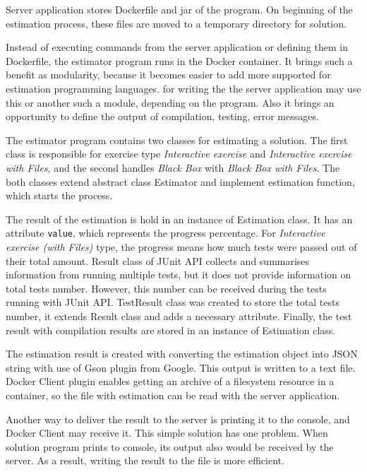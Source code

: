         Server application stores Dockerfile and jar of the program. On beginning of the estimation process, these files are moved to a temporary directory for solution. 
        
        Instead of executing commands from the server application or defining them in Dockerfile, the estimator program runs in the Docker container. It brings such a benefit as modularity, because it becomes easier to add more supported for estimation programming languages. 
        for writing the  the server application may use this or another such a module, depending on the program. Also it brings an opportunity to define the output of compilation, testing, error messages.
        
        The estimator program contains two classes for estimating a solution. The first class is responsible for exercise type \textit{Interactive exercise} and \textit{Interactive exercise with Files}, and the second handles \textit{Black Box} with \textit{Black Box with Files}. The both classes extend abstract class Estimator and implement estimation function, which starts the process.
        
        The result of the estimation is hold in an instance of Estimation class. It has an attribute \texttt{value}, which represents the progress percentage. For \textit{Interactive exercise (with Files)} type, the progress means how much tests were passed out of their total amount. Result class of JUnit API collects and summarises information from running multiple tests, but it does not provide information on total tests number. However, this number can be received during the tests running with JUnit API. TestResult class was created to store the total tests number, it extends Result class and adds a necessary attribute. Finally, the test result with compilation results are stored in an instance of Estimation class.
        
        The estimation result is created with converting the estimation object into JSON string with use of Gson plugin from Google. This output is written to a text file. Docker Client plugin enables getting an archive of a filesystem resource in a container, so the file with estimation can be read with the server application.
        
        Another way to deliver the result to the server is printing it to the console, and Docker Client may receive it. This simple solution has one problem. When solution program prints to console, its output also would be received by the server. As a result, writing the result to the file is more efficient.
    
